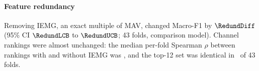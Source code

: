 \paragraph{Feature redundancy}
Removing IEMG, an exact multiple of MAV, changed Macro-F1 by $\RedundDiff$ (95\% CI $\RedundLCB$ to $\RedundUCB$; 43 folds, comparison model). Channel rankings were almost unchanged: the median per-fold Spearman $\rho$ between rankings with and without IEMG was \RedundRho, and the top-12 set was identical in \RedundTopTwelveSame\ of 43 folds. 

